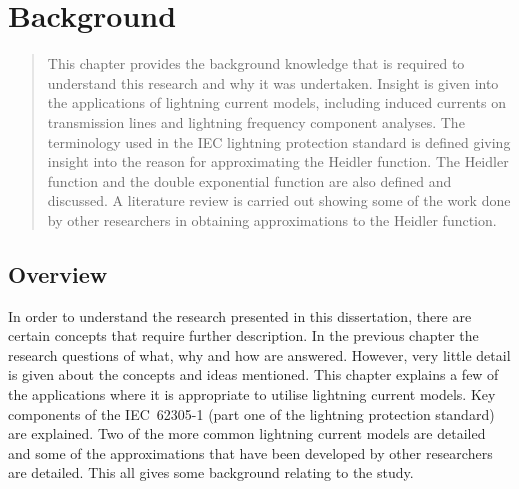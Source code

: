 
\chapter{Background} %

\label{ChapterBackground} %

\begin{quote}
This chapter provides the background knowledge that is required to understand this research and why it was undertaken. Insight is given into the applications of lightning current models, including induced currents on transmission lines and lightning frequency component analyses. The terminology used in the IEC lightning protection standard is defined giving insight into the reason for approximating the Heidler function. The Heidler function and the double exponential function are also defined and discussed. A literature review is carried out showing some of the work done by other researchers in obtaining approximations to the Heidler function.
\end{quote}


\section{Overview}
\label{sec:background_overview}
In order to understand the research presented in this dissertation, there are certain concepts that require further description. In the previous chapter the research questions of what, why and how are answered. However, very little detail is given about the concepts and ideas mentioned. This chapter explains a few of the applications where it is appropriate to utilise lightning current models. Key components of the IEC~62305-1 (part one of the lightning protection standard) are explained. Two of the more common lightning current models are detailed and some of the approximations that have been developed by other researchers are detailed. This all gives some background relating to the study.

